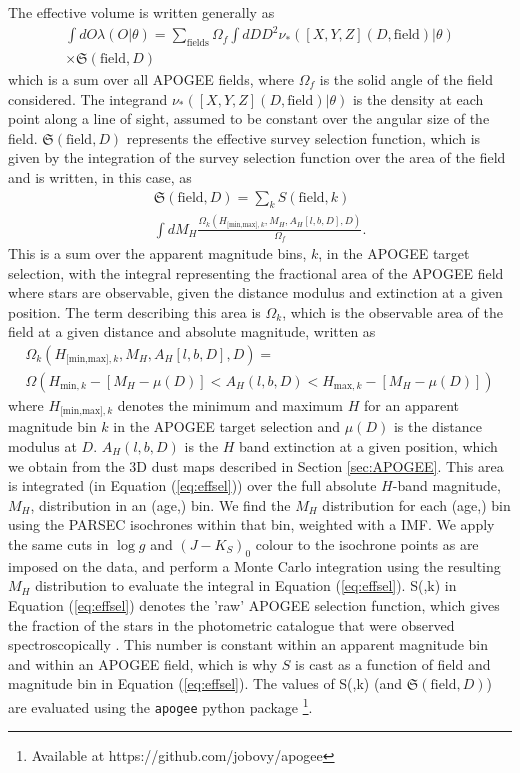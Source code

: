 The effective volume is written generally as
 \begin{multline}
\label{eq:effvol}
\int dO \lambda(O|\theta) = \sum_{\text{fields}} \Omega_f \int dD D^2 \nu_*([X,Y,Z](D,\text{field})|\theta)\\ \times \mathfrak{S}(\text{field},D)
\end{multline}
which is a sum over all APOGEE fields, where $\Omega_f$ is the solid angle of the field considered. The integrand $ \nu_*([X,Y,Z](D,\text{field})|\theta)$ is the density at each point along a line of sight, assumed to be constant over the angular size of the field. $\mathfrak{S}(\text{field},D)$ represents the effective survey selection function, which is given by the integration of the survey selection function over the area of the field and is written, in this case, as
\begin{multline}
\mathfrak{S}(\text{field}, D) = \sum_k S(\text{field},k) \\ \int dM_H \frac{\Omega_k(H_{\text{[min,max]},k}, M_H, A_H[l,b,D], D)}{\Omega_f}.
\label{eq:effsel}
\end{multline}
This is a sum over the apparent magnitude bins, $k$, in the APOGEE target selection, with the integral representing the fractional area of the APOGEE field where stars are observable, given the distance modulus and extinction at a given position. The term describing this area is $\Omega_k$, which is the observable area of the field at a given distance and absolute magnitude, written as
\begin{multline}
\Omega_k(H_{\text{[min,max]},k}, M_H, A_H[l,b,D], D) =\\ \Omega(H_{\text{min},k} - [M_H - \mu(D)] < A_H(l,b,D) < H_{\text{max},k} - [M_H - \mu(D)])
\end{multline}
where $H_{\text{[min,max]},k}$ denotes the minimum and maximum $H$ for an apparent magnitude bin $k$ in the APOGEE target selection and $\mu(D)$ is the distance modulus at $D$.  $A_H(l,b,D)$ is the $H$ band extinction at a given position, which we obtain from the 3D dust maps described in Section \ref{sec:APOGEE}. This area is integrated (in Equation (\ref{eq:effsel})) over the full absolute $H$-band magnitude, $M_H$, distribution in an (age,\feh{}) bin. We find the $M_H$ distribution for each (age,\feh{}) bin using the PARSEC isochrones \citep{2012MNRAS.427..127B} within that bin, weighted with a \citet{2003PASP..115..763C} IMF. We apply the same cuts in $\log{g}$ and $(J-K_S)_0$ colour to the isochrone points as are imposed on the data, and perform a Monte Carlo integration using the resulting $M_H$ distribution to evaluate the integral in Equation (\ref{eq:effsel}). S(,k) in Equation (\ref{eq:effsel}) denotes the 'raw' APOGEE selection function, which gives the fraction of the stars in the photometric catalogue that were observed spectroscopically \citep[see][for details]{2013AJ....146...81Z}. This number is constant within an apparent magnitude bin and within an APOGEE field, which is why $S$ is cast as a function of field and magnitude bin in Equation (\ref{eq:effsel}). The values of S(,k) (and $\mathfrak{S}(\text{field}, D)$) are evaluated using the \texttt{apogee} python package \footnote{Available at {https://github.com/jobovy/apogee}}.

